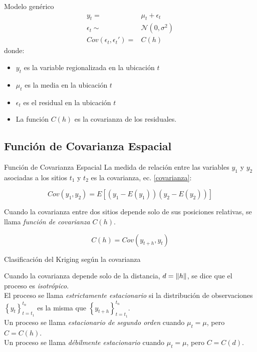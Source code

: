 \documentclass[12pts]{beamer}
\begin{document}
	\begin{frame}{Modelo genérico}
		\begin{align}
		y_t =& \mu_t +\epsilon_t\\
		\epsilon_t \sim& \mathcal{N}(0, \sigma^2)\\
		Cov(\epsilon_t, \epsilon_t') =& C(h)
		\end{align}
	donde:
	\begin{itemize}
		\item $y_t$ es la variable regionalizada en la ubicación $t$
		\item $\mu_t$ es la media en la ubicación $t$
		\item $\epsilon_t$ es el residual en la ubicación $t$ 
		\item La función $C(h)$ es la covarianza de los residuales.
	\end{itemize} 
	\end{frame}

	\subsection{Función de Covarianza Espacial}
	\begin{frame}{Función de Covarianza Espacial}
		La medida de relación entre las variables $y_1$ y $y_2$ asociadas a los sitios $t_1$ y $t_2$ es la covarianza, ec. \ref{covarianza}: 
		
		\begin{equation}
		Cov(y_1, y_2) = E\left[\left(y_1 - E(y_1)\right)\left(y_2 - E(y_2)\right)\right]\label{covarianza}
		\end{equation}
		
		Cuando la covarianza entre dos sitios depende solo de sus posiciones relativas, se llama \textit{función de covarianza} $C(h)$.
		
		\begin{equation}
		C(h) = Cov(y_{t+h}, y_t)\label{funcion_covarianza}
		\end{equation}
	\end{frame}

	\begin{frame}{Clasificación del Kriging según la covarianza}

		Cuando la covarianza depende  solo de la distancia, $d = \norm{h}$, se dice que el proceso es \textit{isotrópico}.\\[5mm]
		
		El proceso se llama \textit{estrictamente estacionario} si la distribución de observaciones $\left\lbrace y_t \right\rbrace_{t=t_1}^{t_n}$ es la misma que $\left\lbrace y_{t + h} \right\rbrace_{t=t_1}^{t_n}$.\\[5mm] 
		
		Un proceso se llama \textit{estacionario de segundo orden} cuando $\mu_t = \mu$, pero $C=C(h)$.\\[5mm]
		
		Un proceso se llama \textit{débilmente estacionario} cuando $\mu_t = \mu$, pero $C=C(d)$. 
	\end{frame}
\end{document}
